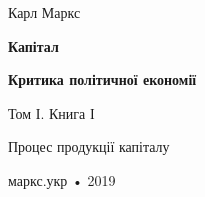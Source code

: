 \thispagestyle{empty}
\null\vspace{0.5cm}
\noindent\htitlespace{} {\large Карл Маркс}

\vspace{1.5cm}
\noindent\htitlespace{} {\HUGE\bfseries{}\MakeUppercase Капітал}

\vspace{0.1cm}
\noindent\htitlespace{} {\large\bfseries Критика політичної економії }

\vspace{1.5cm}
\noindent\htitlespace{} {\large Том І. Книга І}

\noindent\htitlespace{} {\large Процес продукції капіталу}

\vfill
\noindent\htitlespace{} {маркс.укр • 2019}
\clearpage